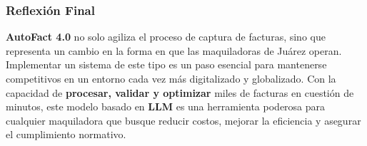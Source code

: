 \documentclass[
  10pt,
  letterpaper,
]{book}
\begin{document}
\subsubsection{Reflexión Final}\label{reflexiuxf3n-final-2}

\textbf{AutoFact 4.0} no solo agiliza el proceso de captura de facturas,
sino que representa un cambio en la forma en que las maquiladoras de
Juárez operan. Implementar un sistema de este tipo es un paso esencial
para mantenerse competitivos en un entorno cada vez más digitalizado y
globalizado. Con la capacidad de \textbf{procesar, validar y optimizar}
miles de facturas en cuestión de minutos, este modelo basado en
\textbf{LLM} es una herramienta poderosa para cualquier maquiladora que
busque reducir costos, mejorar la eficiencia y asegurar el cumplimiento
normativo.
\end{document}
